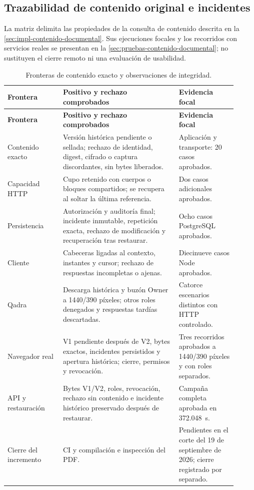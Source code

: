 \subsection{Trazabilidad de contenido original e incidentes}\label{anexo:contenido-documental}

La matriz delimita las propiedades de la consulta de contenido descrita en la \cref{sec:impl-contenido-documental}. Sus ejecuciones focales y los recorridos con servicios reales se presentan en la \cref{sec:pruebas-contenido-documental}; no sustituyen el cierre remoto ni una evaluación de usabilidad.

\begin{longtable}{@{}L{0.22\linewidth}L{0.46\linewidth}L{0.23\linewidth}@{}}
  \caption{Fronteras de contenido exacto y observaciones de integridad.}\label{tab:contenido-integridad}\\
  \toprule
  \textbf{Frontera} & \textbf{Positivo y rechazo comprobados} & \textbf{Evidencia focal} \\
  \midrule
  \endfirsthead
  \toprule
  \textbf{Frontera} & \textbf{Positivo y rechazo comprobados} & \textbf{Evidencia focal} \\
  \midrule
  \endhead
  \bottomrule
  \endfoot
  Contenido exacto & Versión histórica pendiente o sellada; rechazo de identidad, digest, cifrado o captura discordantes, sin bytes liberados. & Aplicación y transporte: 20 casos aprobados. \\
  Capacidad HTTP & Cupo retenido con cuerpos o bloques compartidos; se recupera al soltar la última referencia. & Dos casos adicionales aprobados. \\
  Persistencia & Autorización y auditoría final; incidente inmutable, repetición exacta, rechazo de modificación y recuperación tras restaurar. & Ocho casos PostgreSQL aprobados. \\
  Cliente & Cabeceras ligadas al contexto, instantes y cursor; rechazo de respuestas incompletas o ajenas. & Diecinueve casos Node aprobados. \\
  Qadra & Descarga histórica y buzón Owner a 1440/390 píxeles; otros roles denegados y respuestas tardías descartadas. & Catorce escenarios distintos con HTTP controlado. \\
  Navegador real & V1 pendiente después de V2, bytes exactos, incidentes persistidos y apertura histórica; cierre, permisos y revocación. & Tres recorridos aprobados a 1440/390 píxeles y con roles separados. \\
  API y restauración & Bytes V1/V2, roles, revocación, rechazo sin contenido e incidente histórico preservado después de restaurar. & Campaña completa aprobada en 372.048~s. \\
  Cierre del incremento & CI y compilación e inspección del PDF. & Pendientes en el corte del 19 de septiembre de 2026; cierre registrado por separado. \\
\end{longtable}

